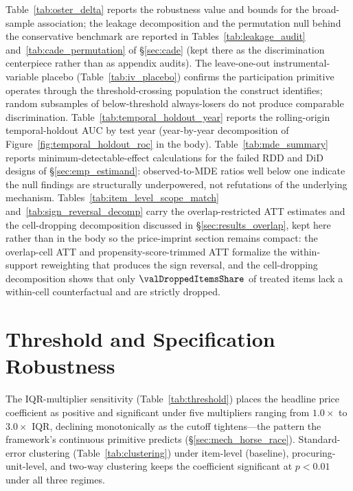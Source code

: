 Table~\ref{tab:oster_delta} reports the
\citet{cinelli2020making} robustness value and
\citet{oster2019unobservable} bounds for the broad-sample
association; the leakage decomposition and the permutation null
behind the conservative benchmark are reported in
Tables~\ref{tab:leakage_audit} and~\ref{tab:cade_permutation}
of \S\ref{sec:cade} (kept there as the discrimination centerpiece
rather than as appendix audits). The leave-one-out
instrumental-variable placebo (Table~\ref{tab:iv_placebo})
confirms the participation primitive operates through the
threshold-crossing population the construct identifies; random
subsamples of below-threshold always-losers do not produce
comparable discrimination. Table~\ref{tab:temporal_holdout_year}
reports the rolling-origin temporal-holdout AUC by test year
(year-by-year decomposition of
Figure~\ref{fig:temporal_holdout_roc} in the body).
Table~\ref{tab:mde_summary} reports
minimum-detectable-effect calculations for the failed RDD and
DiD designs of \S\ref{sec:emp_estimand}: observed-to-MDE ratios
well below one indicate the null findings are structurally
underpowered, not refutations of the underlying mechanism.
Tables~\ref{tab:item_level_scope_match}
and~\ref{tab:sign_reversal_decomp} carry the overlap-restricted
ATT estimates and the cell-dropping decomposition discussed in
\S\ref{sec:results_overlap}, kept here rather than in the body
so the price-imprint section remains compact: the overlap-cell
ATT and propensity-score-trimmed ATT formalize the
within-support reweighting that produces the sign reversal, and
the cell-dropping decomposition shows that only
$\valDroppedItemsShare$ of treated items lack a within-cell
counterfactual and are strictly dropped.













\section{Threshold and Specification Robustness}
\label{app:robustness_tables}

The IQR-multiplier sensitivity (Table~\ref{tab:threshold}) places
the headline price coefficient as positive and significant under
five multipliers ranging from $1.0\!\times$ to $3.0\!\times$
IQR, declining monotonically as the cutoff tightens---the pattern
the framework's continuous primitive predicts
(\S\ref{sec:mech_horse_race}). Standard-error clustering
(Table~\ref{tab:clustering}) under item-level (baseline),
procuring-unit-level, and two-way \citet{cameron2011robust}
clustering keeps the coefficient significant at $p<0.01$ under
all three regimes.

